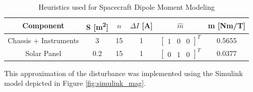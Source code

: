 \begin{table}[H]
    \centering
    \captionsetup{justification = centering}
    \begin{tabular}{c|ccccc}
    Component  & S [m\textsuperscript{2}] & $n$ & $\Delta I$ [A] & $\hat{m}$  & m [Nm/T] \\ \hline
    Chassis + Instruments &   3     &   15    &   1    &   $\begin{bmatrix}  1 & 0 & 0  \end{bmatrix}^T$    &  0.5655 \\
    Solar Panel &   0.2     &  15    &   1    &    $\begin{bmatrix}  0 & 1 & 0  \end{bmatrix}^T$   &  0.0377  \\  
    \end{tabular}
    \caption{Heuristics used for Spacecraft Dipole Moment Modeling}
    \label{tab:spacecraft_dipole_data}
\end{table}

This approximation of the disturbance was implemented using the Simulink model depicted in Figure \ref{fig:simulink_mag}.